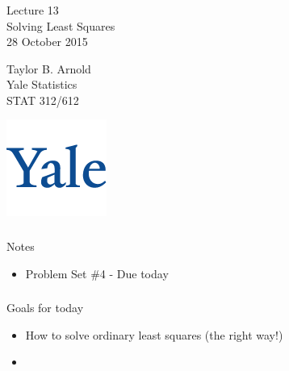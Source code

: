 



\begin{frame}[fragile] \frametitle{}

\vfill

{\fontsize{0.7cm}{0cm}\selectfont Lecture 13 \\\vspace{0.2cm}
Solving Least Squares}\\\vspace{0.5cm}
28 October 2015

\vspace{2cm}

\begin{minipage}{0.6\textwidth}
Taylor B. Arnold \\
Yale Statistics \\
STAT 312/612
\end{minipage}
\hfill
\begin{minipage}{0.3\textwidth}\raggedleft
\includegraphics[scale=0.3]{../yale-logo.png}
\end{minipage}%

\end{frame}

\begin{frame}[fragile] \frametitle{}

{\color{yaleblue}\fontsize{16pt}{20pt}\selectfont Notes}

\begin{itemize}
\item Problem Set \#4 - Due today
\end{itemize}

\end{frame}

\begin{frame}[fragile] \frametitle{}

{\color{yaleblue}\fontsize{16pt}{20pt}\selectfont Goals for today}

\begin{itemize}
\item How to solve ordinary least squares (the right way!)
\item
\end{itemize}

\end{frame}


